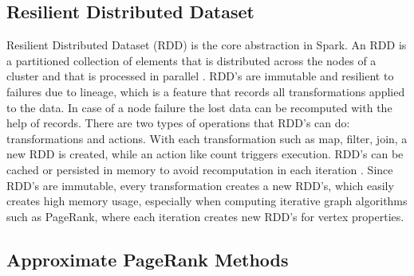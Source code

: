 \subsection{Resilient Distributed Dataset}
Resilient Distributed Dataset (RDD) is the core abstraction in Spark. An RDD is a partitioned collection of elements that is distributed across the nodes of a cluster and that is processed in parallel \cite{apache_spark_rdd_2025}. RDD's are immutable and resilient to failures due to lineage, which is a feature that records all transformations applied to the data. In case of a node failure the lost data can be recomputed with the help of records. There are two types of operations that RDD's can do: transformations and actions. With each transformation such as map, filter, join, a new RDD is created, while an action like  count triggers execution. RDD's can be cached or persisted in memory to avoid recomputation in each iteration \cite{chambers_spark_2018}. Since RDD's are immutable, every transformation creates a new RDD's, which easily creates high memory usage, especially when computing iterative graph algorithms such as PageRank, where each iteration creates new RDD's for vertex properties. 



\subsection{Approximate PageRank Methods}

